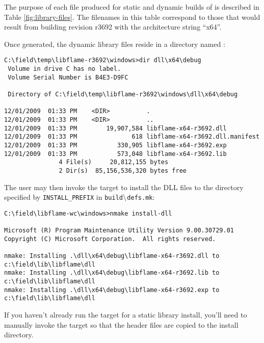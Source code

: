 The purpose of each file produced for static and dynamic builds of \libflame
is described in Table \ref{fig:library-files}.
The filenames in this table correspond to those that would result from building
revision r3692 with the architecture string ``x64''.

Once generated, the dynamic library files reside in a directory named \dllns:

\begin{Verbatim}[frame=single,framesep=2.5mm,xleftmargin=5mm,fontsize=\footnotesize]
C:\field\temp\libflame-r3692\windows>dir dll\x64\debug
 Volume in drive C has no label.
 Volume Serial Number is B4E3-D9FC

 Directory of C:\field\temp\libflame-r3692\windows\dll\x64\debug

12/01/2009  01:33 PM    <DIR>          .
12/01/2009  01:33 PM    <DIR>          ..
12/01/2009  01:33 PM        19,907,584 libflame-x64-r3692.dll
12/01/2009  01:33 PM               618 libflame-x64-r3692.dll.manifest
12/01/2009  01:33 PM           330,905 libflame-x64-r3692.exp
12/01/2009  01:33 PM           573,048 libflame-x64-r3692.lib
               4 File(s)     20,812,155 bytes
               2 Dir(s)  85,156,536,320 bytes free
\end{Verbatim}

\noindent
The user may then invoke the \installdll target to install the DLL files
to the directory specified by {\tt INSTALL\_PREFIX} in
{\tt build$\backslash$defs.mk}:

\begin{Verbatim}[frame=single,framesep=2.5mm,xleftmargin=5mm,fontsize=\footnotesize]
C:\field\libflame-wc\windows>nmake install-dll

Microsoft (R) Program Maintenance Utility Version 9.00.30729.01
Copyright (C) Microsoft Corporation.  All rights reserved.

nmake: Installing .\dll\x64\debug\libflame-x64-r3692.dll to c:\field\lib\libflame\dll
nmake: Installing .\dll\x64\debug\libflame-x64-r3692.lib to c:\field\lib\libflame\dll
nmake: Installing .\dll\x64\debug\libflame-x64-r3692.exp to c:\field\lib\libflame\dll
\end{Verbatim}

If you haven't already run the \install target for a static library install,
you'll need to manually invoke the \installheaders target so that the
\libflame header files are copied to the install directory.




